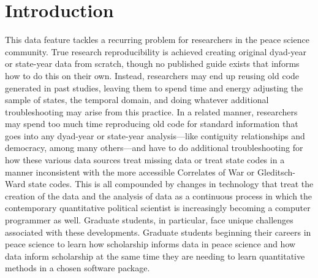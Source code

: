 \documentclass[
  11pt,
]{article}
\begin{document}
\vskip -8.5pt




\setlength{\parindent}{16pt}
\setlength{\parskip}{0pt}

\hypertarget{introduction}{%
\section{Introduction}\label{introduction}}

This data feature tackles a recurring problem for researchers in the peace science community. True research reproducibility is achieved creating original dyad-year or state-year data from scratch, though no published guide exists that informs how to do this on their own. Instead, researchers may end up reusing old code generated in past studies, leaving them to spend time and energy adjusting the sample of states, the temporal domain, and doing whatever additional troubleshooting may arise from this practice. In a related manner, researchers may spend too much time reproducing old code for standard information that goes into any dyad-year or state-year analysis---like contiguity relationships and democracy, among many others---and have to do additional troubleshooting for how these various data sources treat missing data or treat state codes in a manner inconsistent with the more accessible Correlates of War or Gleditsch-Ward state codes. This is all compounded by changes in technology that treat the creation of the data and the analysis of data as a continuous process in which the contemporary quantitative political scientist is increasingly becoming a computer programmer as well. Graduate students, in particular, face unique challenges associated with these developments. Graduate students beginning their careers in peace science to learn how scholarship informs data in peace science and how data inform scholarship at the same time they are needing to learn quantitative methods in a chosen software package.
\end{document}
